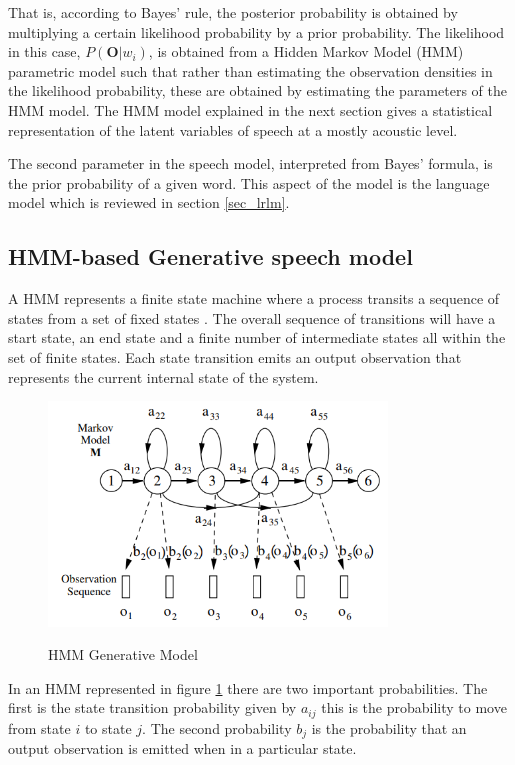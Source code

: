 That is, according to Bayes’ rule, the posterior probability is obtained by multiplying a certain likelihood probability by a prior probability.  The likelihood in this case, $P(\mathbf{O}|w_i)$, is obtained from a Hidden Markov Model (HMM) parametric model such that rather than estimating the observation densities in the likelihood probability, these are obtained by estimating the parameters of the HMM model.  The HMM model explained in the next section gives a statistical representation of the latent variables of speech at a mostly acoustic level.

The second parameter in the speech model, interpreted from Bayes' formula, is the prior probability of a given word.  This aspect of the model is the language model which is reviewed in section \ref{sec_lrlm}.

\subsection{HMM-based Generative speech model}
A HMM represents a finite state machine where a process transits a sequence of states from a set of fixed states \citep{gales2008application, young2002htk}. The overall sequence of transitions will have a start state, an end state and a finite number of intermediate states all within the set of finite states.  Each state transition emits an output observation that represents the current internal state of the system.

\begin{figure}
\centering
  \includegraphics[width=9cm]{thesis/images/hmm}\\
  \caption{HMM Generative Model}\cite{young2002htk}\label{fig_2_1_hmm}
\end{figure}

In an HMM represented in figure \ref{fig_2_1_hmm} there are two important probabilities.  The first is the state transition probability given by $a_{ij}$ this is the probability to move from state $i$ to state $j$.  The second probability $b_j$ is the probability that an output observation is emitted when in a particular state.

